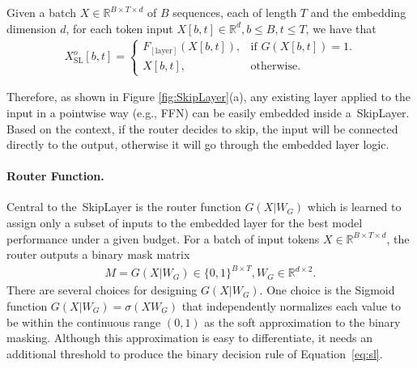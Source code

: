 \documentclass{article}
\newcommand{\skipl}{SkipLayer\xspace}
\begin{document}
Given a batch $X\in\mathbb{R}^{B\times T\times d}$ of $B$ sequences, each of length $T$ and the embedding dimension $d$, for each token input $X[b, t]\in\mathbb{R}^d, b\leq B, t\leq T$, we have that
\begin{align}
    X^{o}_{\text{SL}}[b, t]=
    \begin{cases}
        F_{[\text{layer}]}\left(X[b, t]\right), & \text{if $G(X[b,t])=1$}.\\
        X[b,t], & \text{otherwise}.
    \end{cases}
    \label{eq:sl}
\end{align}

Therefore, as shown in Figure \ref{fig:SkipLayer}(a), any existing layer applied to the input in a pointwise way (e.g., FFN) can be easily embedded inside a~\skipl. Based on the context, if the router decides to skip, the input will be connected directly to the output, otherwise it will go through the embedded layer logic.

\paragraph{Router Function.}
Central to the~\skipl is the router function $G(X|W_G)$ which is learned to assign only a subset of inputs to the embedded layer for the best model performance under a given budget. For a batch of input tokens $X\in\mathbb{R}^{B\times T\times d}$, the router outputs a binary mask matrix
\begin{align}
M=G(X|W_G)\in\{0, 1\}^{B\times T}, W_G\in\mathbb{R}^{d\times 2}.
\label{eq:mask}
\end{align}
There are several choices for designing $G(X|W_G)$. One choice is the Sigmoid function $G(X|W_G)=\sigma (XW_G)$ that independently normalizes each value to be within the continuous range $(0, 1)$ as the soft approximation to the binary masking. Although this approximation is easy to differentiate, it needs an additional threshold to produce the binary decision rule of Equation~\ref{eq:sl}. 
\end{document}
